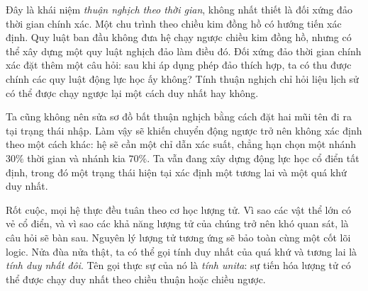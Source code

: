 \begin{classroomqa}
\end{classroomqa}

Đây là khái niệm \emph{thuận nghịch theo thời gian}, không nhất thiết là đối xứng đảo thời gian chính xác. Một chu trình theo chiều kim đồng hồ có hướng tiến xác định. Quy luật ban đầu không đưa hệ chạy ngược chiều kim đồng hồ, nhưng có thể xây dựng một quy luật nghịch đảo làm điều đó. Đối xứng đảo thời gian chính xác đặt thêm một câu hỏi: sau khi áp dụng phép đảo thích hợp, ta có thu được chính các quy luật động lực học ấy không? Tính thuận nghịch chỉ hỏi liệu lịch sử có thể được chạy ngược lại một cách duy nhất hay không.

\begin{classroomqa}
\end{classroomqa}

Ta cũng không nên sửa sơ đồ bất thuận nghịch bằng cách đặt hai mũi tên đi ra tại trạng thái nhập. Làm vậy sẽ khiến chuyển động ngược trở nên không xác định theo một cách khác: hệ sẽ cần một chỉ dẫn xác suất, chẳng hạn chọn một nhánh \(30\%\) thời gian và nhánh kia \(70\%\). Ta vẫn đang xây dựng động lực học cổ điển tất định, trong đó một trạng thái hiện tại xác định một tương lai và một quá khứ duy nhất.

Rốt cuộc, mọi hệ thực đều tuân theo cơ học lượng tử. Vì sao các vật thể lớn có vẻ cổ điển, và vì sao các khả năng lượng tử của chúng trở nên khó quan sát, là câu hỏi sẽ bàn sau. Nguyên lý lượng tử tương ứng sẽ bảo toàn cùng một cốt lõi logic. Nửa đùa nửa thật, ta có thể gọi tính duy nhất của quá khứ và tương lai là \emph{tính duy nhất đôi}. Tên gọi thực sự của nó là \emph{tính unita}: sự tiến hóa lượng tử có thể được chạy duy nhất theo chiều thuận hoặc chiều ngược.

